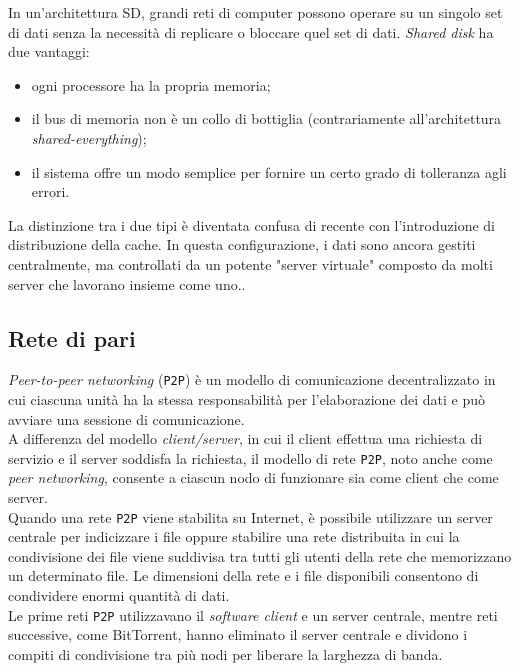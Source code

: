 In un'architettura SD, grandi reti di computer possono operare su un singolo set di dati senza la necessit\`{a} di replicare o bloccare quel set di dati\cite{etichetta7}.
\textit{Shared disk} ha due vantaggi:
\begin{itemize}
\item
ogni processore ha la propria memoria; 
\item
il bus di memoria non \`{e} un collo di bottiglia (contrariamente all'architettura \textit{shared-everything}); 
\item 
il sistema offre un modo semplice per fornire un certo grado di tolleranza agli errori.
\end{itemize}
La distinzione tra i due tipi \`{e} diventata confusa di recente con l'introduzione di distribuzione della cache. In questa configurazione, i dati sono ancora gestiti centralmente, ma controllati da un potente "server virtuale" composto da molti server che lavorano insieme come uno.\cite{etichetta2}.
\item
\subsection{Rete di pari}
\textit{Peer-to-peer networking} (\verb"P2P") \`{e} un modello di comunicazione decentralizzato in cui ciascuna unit\`{a} ha la stessa responsabilit\`{a} per l'elaborazione dei dati e pu\`{o} avviare una sessione di comunicazione. \\
A differenza del modello\textit{ client/server}, in cui il client effettua una richiesta di servizio e il server soddisfa la richiesta, il modello di rete \verb"P2P", noto anche come \textit{peer networking}, consente a ciascun nodo di funzionare sia come client che come server\cite{etichetta13}.\\
Quando una rete \verb"P2P" viene stabilita su Internet, \`{e} possibile utilizzare un server centrale per indicizzare i file oppure stabilire una rete distribuita in cui la condivisione dei file viene suddivisa tra tutti gli utenti della rete che memorizzano un determinato file. Le dimensioni della rete e i file disponibili consentono di condividere enormi quantit\`{a} di dati.\\ 
Le prime reti \verb"P2P" utilizzavano il \textit{software client} e un server centrale, mentre reti successive, come BitTorrent, hanno eliminato il server centrale e dividono i compiti di condivisione tra pi\`{u} nodi per liberare la larghezza di banda.\\


